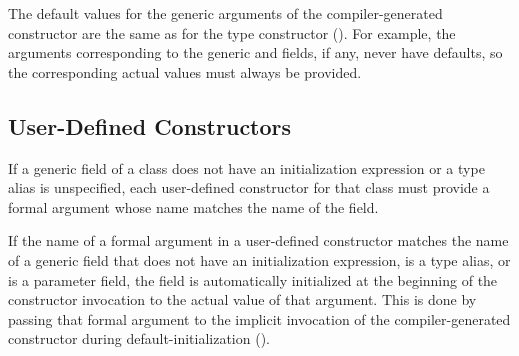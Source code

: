 The default values for the generic arguments of the compiler-generated constructor
are the same as for the type constructor ().
For example, the arguments corresponding to the generic 
and  fields, if any, never have defaults, so the corresponding
actual values must always be provided.

\subsection{User-Defined Constructors}
\label{Generic_User_Constructors}

If a generic field of a class does not have an initialization expression
or a type alias is unspecified, each user-defined constructor for that
class must provide a formal argument whose name
matches the name of the field.

If the name of a formal argument in a user-defined constructor matches the name
of a generic field that does not have an initialization
expression, is a type alias, or is a parameter field, the field is
automatically initialized at the beginning of the constructor invocation
to the actual value of that argument.
This is done by passing that formal argument to the implicit invocation
of the compiler-generated constructor during default-initialization ().


